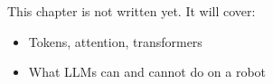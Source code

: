 \label{ch:ai7}
\begin{keyidea}
This chapter is not written yet. It will cover:
\begin{itemize}[nosep]
  \item Tokens, attention, transformers
  \item What LLMs can and cannot do on a robot
\end{itemize}
\end{keyidea}
